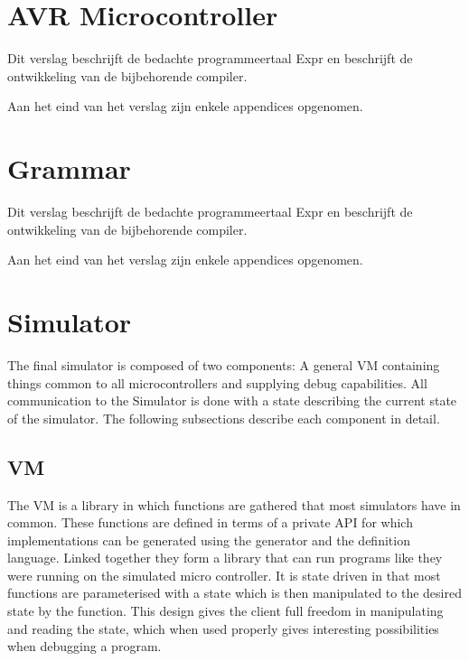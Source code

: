 \documentclass[a4paper]{report}
\begin{document}
\chapter{AVR Microcontroller}
Dit verslag beschrijft de bedachte programmeertaal Expr en beschrijft de
ontwikkeling van de bijbehorende compiler.

Aan het eind van het verslag zijn enkele appendices opgenomen. 

\chapter{Grammar}
Dit verslag beschrijft de bedachte programmeertaal Expr en beschrijft de
ontwikkeling van de bijbehorende compiler.

Aan het eind van het verslag zijn enkele appendices opgenomen. 

\chapter{Simulator}
The final simulator is composed of two components: A general VM
containing things common to all microcontrollers and supplying debug
capabilities. All communication to the Simulator is done with a state
describing the current state of the simulator. The following
subsections describe each component in detail.

\section{VM}

The VM is a library in which functions are gathered that most simulators
have in common. These functions are defined in terms of a private API
for which implementations can be generated using the generator and the
definition language. Linked together they form a library that can run
programs like they were running on the simulated micro controller. It
is state driven in that most functions are parameterised with a state
which is then manipulated to the desired state by the function. This
design gives the client full freedom in manipulating and reading the
state, which when used properly gives interesting possibilities when
debugging a program.
\end{document}
